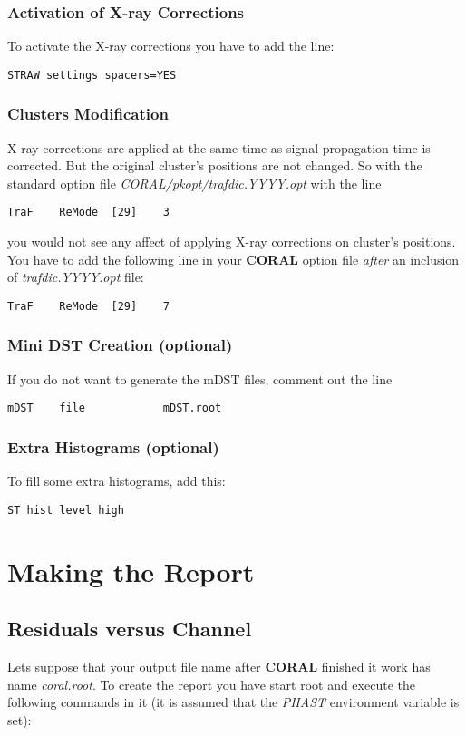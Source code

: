 \documentclass[a4paper,12pt]{article}
\begin{document}
\subsubsection{Activation of X-ray Corrections}
To activate the X-ray corrections you have to add the line:
\begin{verbatim}
STRAW settings spacers=YES
\end{verbatim}

\subsubsection{Clusters Modification}
X-ray corrections are applied at the same time as signal propagation time is
corrected. But the original cluster's positions are not changed. So with the
standard option file {\it CORAL/pkopt/trafdic.YYYY.opt} with the line
\begin{verbatim}
TraF	ReMode	[29]	3
\end{verbatim}
you would not see any affect of applying X-ray corrections on cluster's positions.
You have to add the following
line in your {\bf CORAL} option file {\it after} an inclusion of {\it trafdic.YYYY.opt} file:
\begin{verbatim}
TraF	ReMode	[29]	7
\end{verbatim}

\subsubsection{Mini DST Creation (optional)}
If you do not want to generate the mDST files, comment out the line
\begin{verbatim}
mDST    file            mDST.root
\end{verbatim}

\subsubsection{Extra Histograms (optional)}
To fill some extra histograms, add this:
\begin{verbatim}
ST hist level high
\end{verbatim}

\section{Making the Report}
\subsection{Residuals versus Channel}
Lets suppose that your output file name after {\bf CORAL} finished it work
has name {\it coral.root}. To create the report you have start root
and execute the following commands in it (it is assumed that the {\it PHAST}
environment variable is set):
\end{document}
